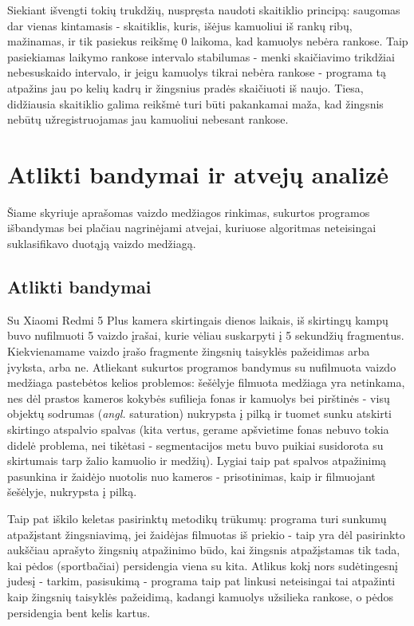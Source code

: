 \documentclass{VUMIFPSkursinis}
\begin{document}
Siekiant išvengti tokių trukdžių, nuspręsta naudoti skaitiklio principą: saugomas dar vienas kintamasis - skaitiklis, kuris, išėjus kamuoliui iš rankų ribų, mažinamas, ir tik pasiekus reikšmę 0 laikoma, kad kamuolys nebėra rankose. Taip pasiekiamas laikymo rankose intervalo stabilumas - menki skaičiavimo trikdžiai nebesuskaido intervalo, ir jeigu kamuolys tikrai nebėra rankose - programa tą atpažins jau po kelių kadrų ir žingsnius pradės skaičiuoti iš naujo. Tiesa, didžiausia skaitiklio galima reikšmė turi būti pakankamai maža, kad žingsnis nebūtų užregistruojamas jau kamuoliui nebesant rankose. 

\section{Atlikti bandymai ir atvejų analizė}
Šiame skyriuje aprašomas vaizdo medžiagos rinkimas, sukurtos programos išbandymas bei plačiau nagrinėjami atvejai, kuriuose algoritmas neteisingai suklasifikavo duotąją vaizdo medžiagą. 
\subsection{Atlikti bandymai}
Su Xiaomi Redmi 5 Plus kamera skirtingais dienos laikais, iš skirtingų kampų buvo nufilmuoti 5 vaizdo įrašai, kurie vėliau suskarpyti į 5 sekundžių fragmentus. Kiekvienamame vaizdo įrašo fragmente žingsnių taisyklės pažeidimas arba įvyksta, arba ne. Atliekant sukurtos programos bandymus su nufilmuota vaizdo medžiaga pastebėtos kelios problemos: šešėlyje filmuota medžiaga yra netinkama, nes dėl prastos kameros kokybės sufilieja fonas ir kamuolys bei pirštinės - visų objektų sodrumas (\textit{angl.} saturation) nukrypsta į pilką ir tuomet sunku atskirti skirtingo atspalvio spalvas (kita vertus, gerame apšvietime fonas nebuvo tokia didelė problema, nei tikėtasi - segmentacijos metu buvo puikiai susidorota su skirtumais tarp žalio kamuolio ir medžių). Lygiai taip pat spalvos atpažinimą pasunkina ir žaidėjo nuotolis nuo kameros - prisotinimas, kaip ir filmuojant šešėlyje, nukrypsta į pilką. 


Taip pat iškilo keletas pasirinktų metodikų trūkumų: programa turi sunkumų atpažįstant žingsniavimą, jei žaidėjas filmuotas iš priekio - taip yra dėl pasirinkto aukščiau aprašyto žingsnių atpažinimo būdo, kai žingsnis atpažįstamas tik tada, kai pėdos (sportbačiai) persidengia viena su kita. Atlikus kokį nors sudėtingesnį judesį - tarkim, pasisukimą - programa taip pat linkusi neteisingai tai atpažinti kaip žingsnių taisyklės pažeidimą, kadangi kamuolys užsilieka rankose, o pėdos persidengia bent kelis kartus. 
\end{document}
